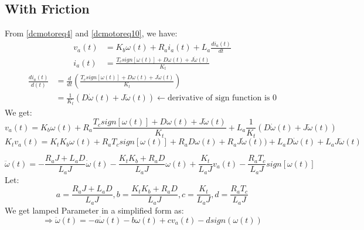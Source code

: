 \subsection{With Friction}
From \autoref{dcmotoreq4} and \autoref{dcmotoreq10}, we have:
\[\begin{split}
	v_a(t) &= K_b \omega(t) + R_a i_a(t) + L_a \frac{di_a(t)}{dt} \\
	i_a(t) &= \frac{T_c sign[\omega(t)] +D\omega(t) + J \dot{\omega}(t)}{K_t}
\end{split}\]
\[\begin{split}
	\frac{di_a(t)}{d(t)} &= \frac{d}{dt}\left(\frac{T_c sign[\omega(t)] +D\omega(t) + J \dot{\omega}(t)}{K_t}\right) \\
	&= \frac{1}{K_t} (D\dot{\omega}(t) + J \ddot{\omega}(t)) \leftarrow \text{derivative of sign function is 0}
\end{split}\]
We get:
\begin{equation}
	v_a(t) = K_b \omega(t) + R_a \frac{T_c sign[\omega(t)] + D\omega(t) + J \dot{\omega}(t)}{K_t} + L_a\frac{1}{K_t} (D\dot{\omega}(t) + J \ddot{\omega}(t))
	\label{dcmotoreq17}
\end{equation}
\[
K_tv_a(t) = K_tK_b \omega(t) + R_aT_c sign[\omega(t)] + R_aD\omega(t) + R_aJ \dot{\omega}(t)) + L_a D\dot{\omega}(t) + L_a J \ddot{\omega}(t)
\]

\begin{tcolorbox}[title=Lumped Parameters with Friction 2nd Order]
	\[
	\ddot{\omega}(t) = - \frac{R_a J + L_a D}{L_aJ} \dot{\omega}(t) -\frac{K_tK_b + R_a D}{L_aJ} \omega(t)  + \frac{K_t}{L_aJ}v_a(t) - \frac{R_aT_c}{L_aJ} sign[\omega(t)]
	\]
	Let:
	\[
	a = \frac{R_a J + L_a D}{L_aJ}, b = \frac{K_tK_b + R_a D}{L_aJ}, c = \frac{K_t}{L_aJ}, d = \frac{R_aT_c}{L_aJ}
	\]
	We get lamped Parameter in a simplified form as:
	\begin{equation}
		\Rightarrow \ddot{\omega}(t) = - a\dot{\omega}(t) - b\omega(t) + cv_a(t) - dsign(\omega(t))
		\label{dcmotoreq18}
	\end{equation}
\end{tcolorbox}
